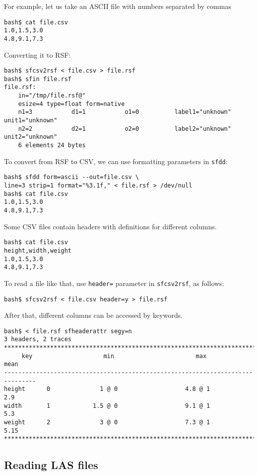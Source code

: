 For example, let us take an ASCII file with numbers separated by commas
\begin{verbatim}
bash$ cat file.csv
1.0,1.5,3.0
4.8,9.1,7.3
\end{verbatim}
Converting it to RSF:
\begin{verbatim}
bash$ sfcsv2rsf < file.csv > file.rsf
bash$ sfin file.rsf
file.rsf:
    in="/tmp/file.rsf@"
    esize=4 type=float form=native 
    n1=3           d1=1           o1=0          label1="unknown" unit1="unknown" 
    n2=2           d2=1           o2=0          label2="unknown" unit2="unknown" 
	6 elements 24 bytes
\end{verbatim}

To convert from RSF to CSV, we can use formatting parameters in \texttt{sfdd}:
\begin{verbatim}
bash$ sfdd form=ascii --out=file.csv \
line=3 strip=1 format="%3.1f," < file.rsf > /dev/null
bash$ cat file.csv
1.0,1.5,3.0
4.8,9.1,7.3
\end{verbatim}

Some CSV files contain headers with definitions for different columns.
\begin{verbatim}
bash$ cat file.csv
height,width,weight
1.0,1.5,3.0
4.8,9.1,7.3
\end{verbatim}
To read a file like that, use \texttt{header=} parameter in \texttt{sfcsv2rsf}, as follows:
\begin{verbatim}
bash$ sfcsv2rsf < file.csv header=y > file.rsf
\end{verbatim}
After that, different columns can be accessed by keywords.
\begin{verbatim}
bash$ < file.rsf sfheaderattr segy=n
3 headers, 2 traces
*******************************************************************************
     key                    min                       max                 mean
-------------------------------------------------------------------------------
height      0              1 @ 0                   4.8 @ 1                 2.9
width       1            1.5 @ 0                   9.1 @ 1                 5.3
weight      2              3 @ 0                   7.3 @ 1                5.15
*******************************************************************************

\end{verbatim}

\subsection{Reading LAS files}

